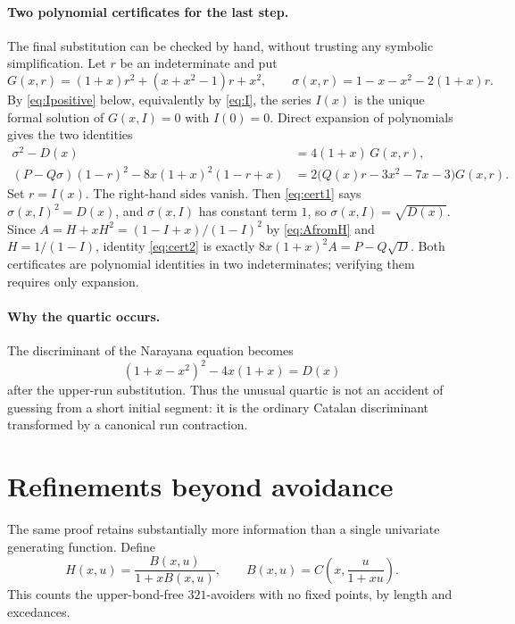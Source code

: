 \documentclass[11pt,letterpaper]{article}
\numberwithin{equation}{section}
\theoremstyle{definition}
\begin{document}
\paragraph{Two polynomial certificates for the last step.}
The final substitution can be checked by hand, without trusting any
symbolic simplification. Let $r$ be an indeterminate and put
\begin{equation}
 G(x,r)=(1+x)r^2+(x+x^2-1)r+x^2,
 \qquad
 \sigma(x,r)=1-x-x^2-2(1+x)r.
 \label{eq:Gdef}
\end{equation}
By \eqref{eq:Ipositive} below, equivalently by \eqref{eq:I}, the series
$I(x)$ is the unique formal solution of $G(x,I)=0$ with $I(0)=0$.
Direct expansion of polynomials gives the two identities
\begin{align}
 \sigma^2-D(x)&=4(1+x)\,G(x,r),\label{eq:cert1}\\
 (P-Q\sigma)(1-r)^2-8x(1+x)^2(1-r+x)
   &=2\bigl(Q(x)r-3x^2-7x-3\bigr)G(x,r).\label{eq:cert2}
\end{align}
Set $r=I(x)$. The right-hand sides vanish. Then \eqref{eq:cert1} says
$\sigma(x,I)^2=D(x)$, and $\sigma(x,I)$ has constant term $1$, so
$\sigma(x,I)=\sqrt{D(x)}$. Since $A=H+xH^2=(1-I+x)/(1-I)^2$ by
\eqref{eq:AfromH} and $H=1/(1-I)$, identity \eqref{eq:cert2} is exactly
$8x(1+x)^2A=P-Q\sqrt D$. Both certificates are polynomial identities in
two indeterminates; verifying them requires only expansion.

\paragraph{Why the quartic occurs.}
The discriminant of the Narayana equation becomes
\[
 (1+x-x^2)^2-4x(1+x)=D(x)
\]
after the upper-run substitution. Thus the unusual quartic is not an
accident of guessing from a short initial segment: it is the ordinary
Catalan discriminant transformed by a canonical run contraction.

\section{Refinements beyond avoidance}
\label{sec:refinements}

The same proof retains substantially more information than a single
univariate generating function. Define
\begin{equation}
 H(x,u)=\frac{B(x,u)}{1+xB(x,u)},
 \qquad B(x,u)=C\!\left(x,\frac{u}{1+xu}\right).
 \label{eq:Hxu}
\end{equation}
This counts the upper-bond-free $321$-avoiders with no fixed points,
by length and excedances.
\end{document}
